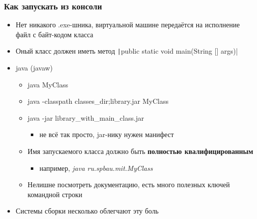 \documentclass[xetex,mathserif,serif]{beamer}
\begin{document}
	\begin{frame}
		\frametitle{Как запускать из консоли}
		\begin{itemize}
			\item Нет никакого .exe-шника, виртуальной машине передаётся на исполнение файл с байт-кодом класса
			\item Оный класс должен иметь метод \texttt|public static void main(String [] args)|
			\item java (javaw)
			\begin{itemize}
				\item java MyClass
				\item java -classpath classes\_dir;library.jar MyClass
				\item java -jar library\_with\_main\_class.jar
				\begin{itemize}
					\item не всё так просто, jar-нику нужен манифест
				\end{itemize}
				\item Имя запускаемого класса должно быть \textbf{полностью квалифицированным}
				\begin{itemize}
					\item например, \textit{java ru.spbau.mit.MyClass}
				\end{itemize}
				\item Нелишне посмотреть документацию, есть много полезных ключей командной строки
			\end{itemize}
			\item Системы сборки несколько облегчают эту боль
		\end{itemize}
	\end{frame}
\end{document}
